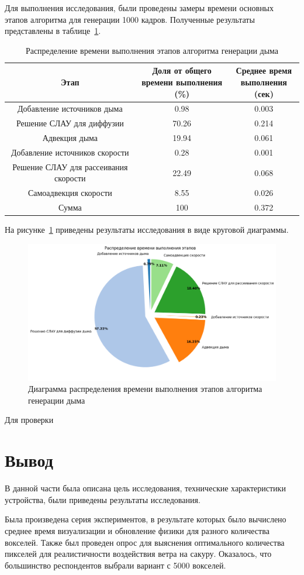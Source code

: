 Для выполнения исследования, были проведены замеры времени основных этапов алгоритма для генерации 1000 кадров. Полученные результаты представлены в таблице~\ref{tab:no_parallel}.

\begin{table}[H]
	\caption{Распределение времени выполнения этапов алгоритма генерации дыма}
	\label{tab:no_parallel}
	\centering
	\begin{tabular}{|c|c|c|}
		\hline
		Этап&\shortstack{Доля от общего\\времени выполнения (\%)}&\shortstack{Среднее время\\ выполнения (сек)}\\\hline
		Добавление источников дыма&0.98&0.003\\\hline
		Решение СЛАУ для диффузии &70.26&0.214\\\hline
		Адвекция дыма&19.94&0.061\\\hline
		Добавление источников скорости&0.28&0.001\\\hline
		Решение СЛАУ для рассеивания скорости&22.49&0.068\\\hline
		Самоадвекция скорости&8.55&0.026\\\hline\hline
		Сумма&100&	0.372\\\hline
	\end{tabular}
\end{table}

На рисунке~\ref{fig:no_parallel} приведены результаты исследования в виде круговой диаграммы.

\begin{figure}[H]
	\centering
	\includegraphics[width=1.0\textwidth,page=1]{assets/img/pie.png}
	\caption{Диаграмма распределения времени выполнения этапов алгоритма генерации дыма}
	\label{fig:no_parallel}
\end{figure}

Для проверки 

\section*{Вывод}
В данной части была описана цель исследования, технические характеристики устройства, были приведены результаты исследования.

Была произведена серия экспериментов, в результате которых было вычислено среднее время визуализации и обновление физики для разного количества вокселей. Также был проведен опрос для выяснения оптимального количества пикселей для реалистичности воздействия ветра на сакуру. Оказалось, что большинство респондентов выбрали вариант с 5000 вокселей.
